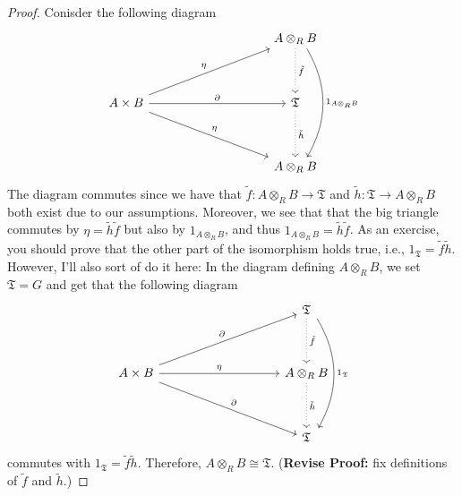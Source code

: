 \documentclass[12pt,reqno]{amsart}
\theoremstyle{plain}
\begin{document}
\begin{proof}
Conisder the following diagram
$$\begin{tikzcd}
                                                            &  &  &  & A \otimes_R B \arrow[dd, "\tilde{f}", dotted] \arrow[dddd, "1_{A \otimes_R B}", bend left, shift left=2] \\
                                                            &  &  &  &                                                                      \\
A \times B \arrow[rrrr, "\partial"] \arrow[rrrruu, "\eta"] \arrow[rrrrdd, "\eta"] &  &  &  & \mathfrak{T} \arrow[dd, "\tilde{h}", dotted]                                            \\
                                                            &  &  &  &                                                                      \\
                                                            &  &  &  & A \otimes_R B                                                                   
\end{tikzcd}$$ 
The diagram commutes since we have that $\tilde{f} \colon A \otimes_R B \to \mathfrak{T}$ and $\tilde{h} \colon \mathfrak{T} \to A \otimes_R B$ both exist due to our assumptions. Moreover, we see that that the big triangle commutes by $\eta = \tilde{h} \tilde{f}$ but also by $1_{A \otimes_R B}$, and thus $1_{A \otimes_R B} = \tilde{h} \tilde{f}$. As an exercise, you should prove that the other part of the isomorphism holds true, i.e., $1_{\mathfrak{T}} = \tilde{f} \tilde{h}$. However, I'll also sort of do it here: In the diagram defining $A \otimes_R B$, we set $\mathfrak{T} = G$ and get that the following diagram 
$$\begin{tikzcd}
                                                            &  &  &  & \mathfrak{T} \arrow[dd, "\tilde{f}", dotted] \arrow[dddd, "1_{\mathfrak{T}}", bend left, shift left=2] \\
                                                            &  &  &  &                                                                      \\
A \times B \arrow[rrrr, "\eta"] \arrow[rrrruu, "\partial"] \arrow[rrrrdd, "\partial"] &  &  &  & A \otimes_R B \arrow[dd, "\tilde{h}", dotted]                                            \\
                                                            &  &  &  &                                                                      \\
                                                            &  &  &  & \mathfrak{T}
\end{tikzcd}$$ commutes with $1_{\mathfrak{T}} = \tilde{f} \tilde{h}$. Therefore, $A \otimes_R B \cong \mathfrak{T}$. (\textbf{Revise Proof:} fix definitions of $\tilde{f}$ and $\tilde{h}$.)
\end{proof} 
\newpage 
\end{document}
